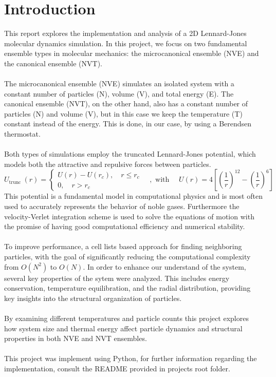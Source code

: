 \section*{Introduction}\label{sec:introduction} %
This report explores the implementation and analysis of a 2D Lennard-Jones molecular dynamics simulation. In this project, we focus on two fundamental ensemble types in molecular mechanics: the microcanonical ensemble (NVE) and the canonical ensemble (NVT). \\
\\
The microcanonical ensemble (NVE) simulates an isolated system with a constant number of particles (N), volume (V), and total energy (E). The canonical ensemble (NVT), on the other hand, also has a constant number of particles (N) and volume (V), but in this case we keep the temperature (T) constant instead of the energy. This is done, in our case, by using a Berendsen thermostat.\\
\\
Both types of simulations employ the truncated Lennard-Jones potential, which models both the attractive and repulsive forces between particles.
\begin{equation}
	U_{\text {trunc }}(r)=\left\{\begin{array}{l}
		U(r)-U\left(r_c\right), \quad r \leq r_c \\ 0, \quad r>r_c \end{array} \quad, \text { with } \quad U(r)=4\left[\left(\frac{1}{r}\right)^{12}-\left(\frac{1}{r}\right)^6\right]\right.
\end{equation}
This potential is a fundamental model in computational physics and is most often used to accurately represents the behavior of noble gases. Furthermore the velocity-Verlet integration scheme is used to solve the equations of motion with the promise of having good computational efficiency and numerical stability.\\
\\
To improve performance, a cell lists based approach for finding neighboring particles, with the goal of significantly reducing the computational complexity from $O(N^2)$ to $O(N)$. In order to enhance our understand of the system, several key properties of the sytem were analyzed. This includes energy conservation, temperature equilibration, and the radial distribution, providing key insights into the structural organization of particles. \\
\\
By examining different temperatures and particle counts this project explores how system size and thermal energy affect particle dynamics and structural properties in both NVE and NVT ensembles.\\
\\
This project was implement using Python, for further information regarding the implementation, consult the README provided in projects root folder.

